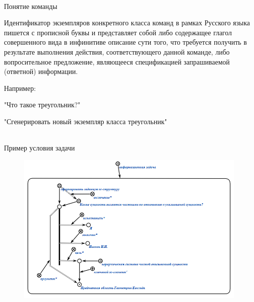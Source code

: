 \begin{frame}{\\Понятие команды}
	\topline
	\justifying
	\vspace{10mm}

    
   \bigskip
    
   Идентификатор экземпляров конкретного класса команд в рамках Русского языка пишется с прописной буквы и представляет собой либо содержащее глагол совершенного вида в инфинитиве описание сути того, что требуется получить в результате выполнения действия, соответствующего данной команде, либо вопросительное предложение, являющееся спецификацией запрашиваемой (ответной) информации.
   
   \bigskip
   
   Например:
   \begin{textitemize}
   		\item "Что такое треугольник?"
   		\item "Сгенерировать новый экземпляр класса треугольник"
   \end{textitemize}
   
\end{frame}

\begin{frame}{\\Пример условия задачи}
	\topline
	\justifying
	\vspace{10mm}
	\begin{SCn}
		\begin{figure}[H]
			\includegraphics[scale=0.5]{./figures/sd_problems/entities.png}
		\end{figure}
	\end{SCn}
\end{frame}

